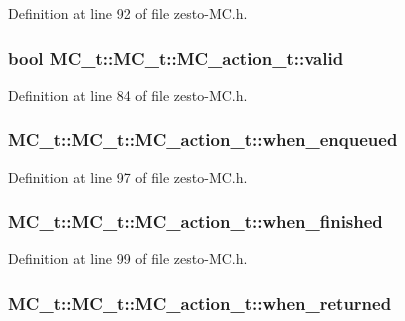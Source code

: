 Definition at line 92 of file zesto-MC.h.
\subsubsection[{valid}]{\setlength{\rightskip}{0pt plus 5cm}bool MC\_\-t::MC\_\-t::MC\_\-action\_\-t::valid}\label{structMC__t_1_1MC__action__t_0907d0ce545e8d93ee829011ccbba917}




Definition at line 84 of file zesto-MC.h.
\subsubsection[{when\_\-enqueued}]{ MC\_\-t::MC\_\-t::MC\_\-action\_\-t::when\_\-enqueued}\label{structMC__t_1_1MC__action__t_19c6b3bf6b790cc4c166eacf272c3d29}




Definition at line 97 of file zesto-MC.h.
\subsubsection[{when\_\-finished}]{ MC\_\-t::MC\_\-t::MC\_\-action\_\-t::when\_\-finished}\label{structMC__t_1_1MC__action__t_9407395cfefbc72cc07401e1e9193ded}




Definition at line 99 of file zesto-MC.h.
\subsubsection[{when\_\-returned}]{ MC\_\-t::MC\_\-t::MC\_\-action\_\-t::when\_\-returned}\label{structMC__t_1_1MC__action__t_054a8252d328aa5e08d8fcb5b1d292d8}





